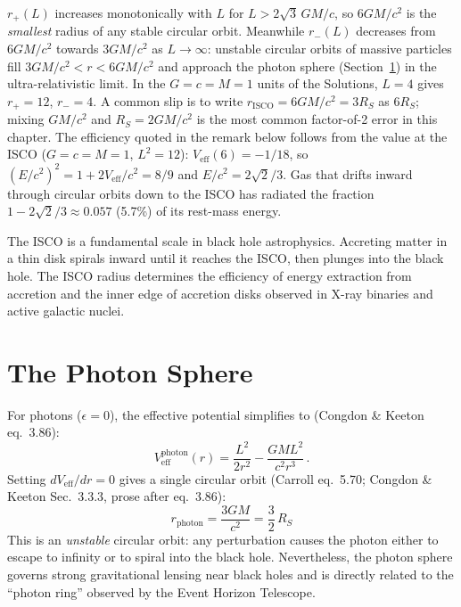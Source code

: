 \begin{annotation}
$r_+(L)$ increases monotonically with $L$ for
$L > 2\sqrt3\,GM/c$, so $6GM/c^2$ is the \emph{smallest} radius of
any stable circular orbit.  Meanwhile $r_-(L)$ decreases from
$6GM/c^2$ towards $3GM/c^2$ as $L \to \infty$: unstable circular
orbits of massive particles fill $3GM/c^2 < r < 6GM/c^2$ and
approach the photon sphere (Section~\ref{sec:photon_sphere}) in the
ultra-relativistic limit.  In the $G = c = M = 1$ units of the
Solutions, $L = 4$ gives $r_+ = 12$, $r_- = 4$.
A common slip is to write $r_{\mathrm{ISCO}} = 6GM/c^2 = 3R_S$ as
$6R_S$; mixing $GM/c^2$ and $R_S = 2GM/c^2$ is the most common
factor-of-2 error in this chapter.
The efficiency quoted in the remark below follows from the value at the ISCO
($G = c = M = 1$, $L^2 = 12$): $V_{\mathrm{eff}}(6) = -1/18$, so
$(E/c^2)^2 = 1 + 2V_{\mathrm{eff}}/c^2 = 8/9$ and $E/c^2 = 2\sqrt2/3$.  Gas
that drifts inward through circular orbits down to the ISCO has
radiated the fraction $1 - 2\sqrt2/3 \approx 0.057$ (5.7\%) of its
rest-mass energy.
\end{annotation}


\begin{remark}
The ISCO is a fundamental scale in black hole astrophysics.  Accreting
matter in a thin disk spirals inward until it reaches the ISCO, then
plunges into the black hole.  The ISCO radius determines the
efficiency of energy extraction from accretion and the inner edge of
accretion disks observed in X-ray binaries and active galactic nuclei.
\end{remark}


\section{The Photon Sphere}
\label{sec:photon_sphere}

For photons ($\epsilon = 0$), the effective potential simplifies to
(Congdon \& Keeton eq.~3.86):
\begin{equation}
    V_{\mathrm{eff}}^{\mathrm{photon}}(r) = \frac{L^2}{2r^2}
    - \frac{GML^2}{c^2 r^3} \,.
    \label{eq:Veff_photon}
\end{equation}
Setting $dV_{\mathrm{eff}}/dr = 0$ gives a single circular orbit
(Carroll eq.~5.70; Congdon \& Keeton Sec.~3.3.3, prose after eq.~3.86):
\begin{equation}
    \boxed{r_{\mathrm{photon}} = \frac{3GM}{c^2} = \frac{3}{2}\, R_S}
    \label{eq:photon_sphere}
\end{equation}
This is an \emph{unstable} circular orbit: any perturbation causes
the photon either to escape to infinity or to spiral into the black hole.
Nevertheless, the photon sphere governs strong gravitational
lensing near black holes and is directly related to the ``photon ring''
observed by the Event Horizon Telescope.

